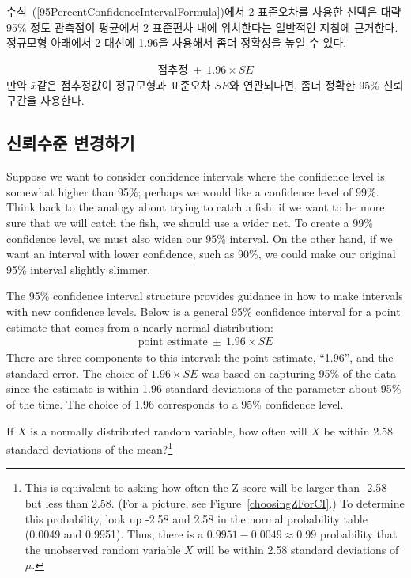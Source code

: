 수식~(\ref{95PercentConfidenceIntervalFormula})에서 2 표준오차를 사용한 선택은 대략 95\% 정도 관측점이 평균에서 2 표준편차 내에 위치한다는 일반적인 지침에 근거한다. 정규모형 아래에서 2 대신에 1.96을 사용해서 좀더 정확성을 높일 수 있다.

\begin{eqnarray}
\text{점추정}\ \pm\ 1.96\times SE
\label{95PercentCIWhenUsingNormalModel}
\end{eqnarray}
만약 $\bar{x}$같은 점추정값이 정규모형과 표준오차 $SE$와 연관되다면, 좀더 정확한 95\% 신뢰구간을 사용한다.

\subsection{신뢰수준 변경하기}
\label{changingTheConfidenceLevelSection}


Suppose we want to consider confidence intervals where the confidence level is somewhat higher than 95\%; perhaps we would like a confidence level of 99\%. Think back to the analogy about trying to catch a fish: if we want to be more sure that we will catch the fish, we should use a wider net. To create a 99\% confidence level, we must also widen our 95\% interval. On the other hand, if we want an interval with lower confidence, such as 90\%, we could make our original 95\% interval slightly slimmer.

The 95\% confidence interval structure provides guidance in how to make intervals with new confidence levels. Below is a general 95\% confidence interval for a point estimate that comes from a nearly normal distribution:
\begin{eqnarray}
\text{point estimate}\ \pm\ 1.96\times SE
\end{eqnarray}
There are three components to this interval: the point estimate, ``1.96'', and the standard error. The choice of $1.96\times SE$ was based on capturing 95\% of the data since the estimate is within 1.96 standard deviations of the parameter about 95\% of the time. The choice of 1.96 corresponds to a 95\% confidence level. 

\begin{exercise} \label{leadInForMakingA99PercentCIExercise}
If $X$ is a normally distributed random variable, how often will $X$ be within 2.58 standard deviations of the mean?\footnote{This is equivalent to asking how often the Z-score will be larger than -2.58 but less than 2.58. (For a picture, see Figure~\ref{choosingZForCI}.) To determine this probability, look up -2.58 and 2.58 in the normal probability table (0.0049 and 0.9951). Thus, there is a $0.9951-0.0049 \approx 0.99$ probability that the unobserved random variable $X$ will be within 2.58 standard deviations of $\mu$.}
\end{exercise}

